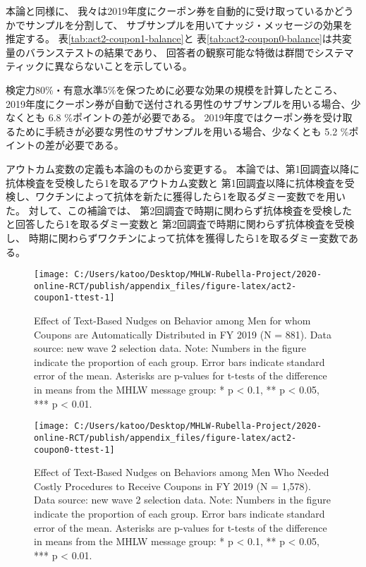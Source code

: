 \documentclass[
  11pt,
  a4paper,
]{article}
\begin{document}
本論と同様に、
我々は2019年度にクーポン券を自動的に受け取っているかどうかでサンプルを分割して、
サブサンプルを用いてナッジ・メッセージの効果を推定する。
表\ref{tab:act2-coupon1-balance}と
表\ref{tab:act2-coupon0-balance}は共変量のバランステストの結果であり、
回答者の観察可能な特徴は群間でシステマティックに異ならないことを示している。

検定力80\%・有意水準5\%を保つために必要な効果の規模を計算したところ、
2019年度にクーポン券が自動で送付される男性のサブサンプルを用いる場合、少なくとも
6.8
\%ポイントの差が必要である。
2019年度ではクーポン券を受け取るために手続きが必要な男性のサブサンプルを用いる場合、少なくとも
5.2
\%ポイントの差が必要である。

アウトカム変数の定義も本論のものから変更する。
本論では、第1回調査以降に抗体検査を受検したら1を取るアウトカム変数と
第1回調査以降に抗体検査を受検し、ワクチンによって抗体を新たに獲得したら1を取るダミー変数でを用いた。
対して、この補論では、
第2回調査で時期に関わらず抗体検査を受検したと回答したら1を取るダミー変数と
第2回調査で時期に関わらず抗体検査を受検し、
時期に関わらずワクチンによって抗体を獲得したら1を取るダミー変数である。

\begin{figure}[t]
\texttt{[image: C:/Users/katoo/Desktop/MHLW-Rubella-Project/2020-online-RCT/publish/appendix\_files/figure-latex/act2-coupon1-ttest-1]} \caption{Effect of Text-Based Nudges on Behavior among Men for whom Coupons are Automatically Distributed in FY 2019 (N = 881). Data source: new wave 2 selection data. Note: Numbers in the figure indicate the proportion of each group. Error bars indicate standard error of the mean. Asterisks are p-values for t-tests of the difference in means from the MHLW message group: * p < 0.1, ** p < 0.05, *** p < 0.01.}\label{fig:act2-coupon1-ttest}
\end{figure}
\begin{figure}[t]
\texttt{[image: C:/Users/katoo/Desktop/MHLW-Rubella-Project/2020-online-RCT/publish/appendix\_files/figure-latex/act2-coupon0-ttest-1]} \caption{Effect of Text-Based Nudges on Behaviors among Men Who Needed Costly Procedures to Receive Coupons in FY 2019 (N = 1,578). Data source: new wave 2 selection data. Note: Numbers in the figure indicate the proportion of each group. Error bars indicate standard error of the mean. Asterisks are p-values for t-tests of the difference in means from the MHLW message group: * p < 0.1, ** p < 0.05, *** p < 0.01.}\label{fig:act2-coupon0-ttest}
\end{figure}
\end{document}

